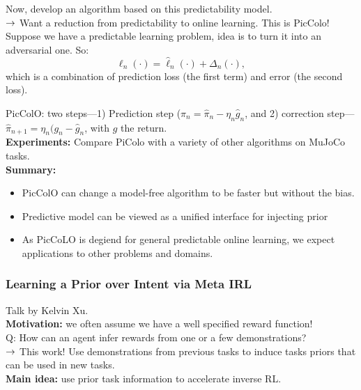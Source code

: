 Now, develop an algorithm based on this predictability model. \\

$\rightarrow$ Want a reduction from predictability to online learning. This is PicColo! \\

Suppose we have a predictable learning problem, idea is to turn it into an adversarial one. So:
\[
\ell_n(\cdot) = \hat{\ell}_n(\cdot) + \Delta_n(\cdot),
\]
which is a combination of prediction loss (the first term) and error (the second loss). 

PicColO: two steps---1) Prediction step ($\pi_n = \hat{\pi}_n - \eta_{n}\hat{g}_n$, and 2) correction step---$\hat{\pi}_{n+1} = \eta_n(g_n - \hat{g}_n$, with $g$ the return.\\

{\bf Experiments:} Compare PiColo with a variety of other algorithms on MuJoCo tasks. \\

{\bf Summary:}
\begin{itemize}
    \item PicColO can change a model-free algorithm to be faster but without the bias.
    \item Predictive model can be viewed as a unified interface for injecting prior
    \item As PicCoLO is degiend for general predictable online learning, we expect applications to other problems and domains.
\end{itemize}


\spacerule

\subsubsection{Learning a Prior over Intent via Meta IRL}

Talk by Kelvin Xu. \\

{\bf Motivation:} we often assume we have a well specified reward function! \\

Q: How can an agent infer rewards from one or a few demonstrations? \\

$\rightarrow$ This work! Use demonstrations from previous tasks to induce tasks priors that can be used in new tasks. \\

{\bf Main idea:} use prior task information to accelerate inverse RL. \\

